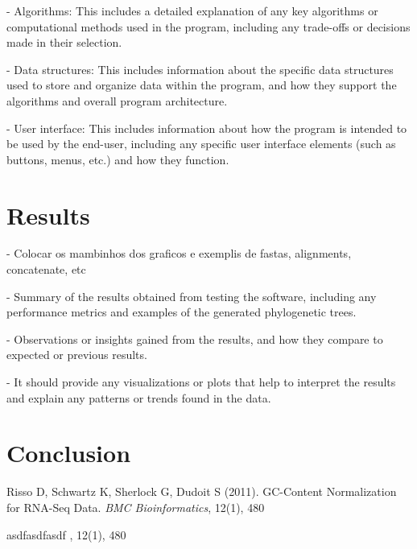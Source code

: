 \documentclass[12pt]{article}
\begin{document}
- Algorithms: This includes a detailed explanation of any key algorithms or computational methods used in the program, including any trade-offs or decisions made in their selection.

- Data structures: This includes information about the specific data structures used to store and organize data within the program, and how they support the algorithms and overall program architecture.

- User interface: This includes information about how the program is intended to be used by the end-user, including any specific user interface elements (such as buttons, menus, etc.) and how they function.





\section{Results}\label{sec:desenvolvimentos}

- Colocar os mambinhos dos graficos e exemplis de fastas, alignments, concatenate, etc

- Summary of the results obtained from testing the software, including any performance metrics and examples of the generated phylogenetic trees. 

- Observations or insights gained from the results, and how they compare to expected or previous results. 

- It should provide any visualizations or plots that help to interpret the results and explain any patterns or trends found in the data.




\section{Conclusion}\label{sec:conclusoes}



\begin{thebibliography}{}

Risso D, Schwartz K, Sherlock G, Dudoit S (2011). GC-Content Normalization for RNA-Seq Data. \textit{BMC Bioinformatics}, 12(1), 480

asdfasdfasdf \textit{}, 12(1), 480

\end{thebibliography}
\end{document}

